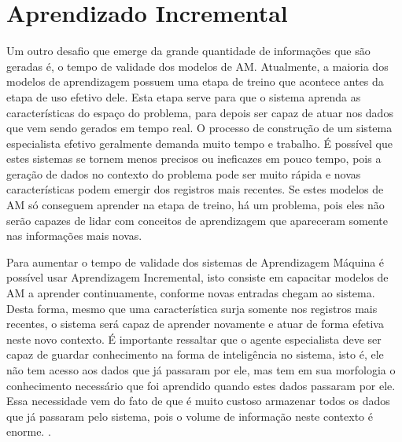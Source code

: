\chapter{Aprendizado Incremental}


Um outro desafio que emerge da grande quantidade de informações que são geradas é, o tempo de validade dos modelos de AM. Atualmente, a maioria dos modelos de aprendizagem possuem uma etapa de treino que acontece antes da etapa de uso efetivo dele. Esta etapa serve para que o sistema aprenda as características do espaço do problema, para depois ser capaz de atuar nos dados que vem sendo gerados em tempo real. 
O processo de construção de um sistema especialista efetivo geralmente demanda muito tempo e trabalho. É possível que estes sistemas se tornem menos precisos ou ineficazes em pouco tempo, pois a geração de dados no contexto do problema pode ser muito rápida e novas características podem emergir dos registros mais recentes. Se estes modelos de AM só conseguem aprender na etapa de treino, há um problema, pois eles não serão capazes de lidar com conceitos de aprendizagem que apareceram somente nas informações mais novas. 

Para aumentar o tempo de validade dos sistemas de Aprendizagem Máquina é possível usar Aprendizagem Incremental, isto consiste em capacitar modelos de AM a aprender continuamente, conforme novas entradas chegam ao sistema. Desta forma, mesmo que uma característica surja somente nos registros mais recentes, o sistema será capaz de aprender novamente e atuar de forma efetiva neste novo contexto. É importante ressaltar que o agente especialista deve ser capaz de guardar conhecimento na forma de inteligência no sistema, isto é, ele não tem acesso aos dados que já passaram por ele, mas tem em sua morfologia o conhecimento necessário que foi aprendido quando estes dados passaram por ele. Essa necessidade vem do fato de que é muito custoso armazenar todos os dados que já passaram pelo sistema, pois o volume de informação neste contexto é enorme. \cite{incremental2011}.

